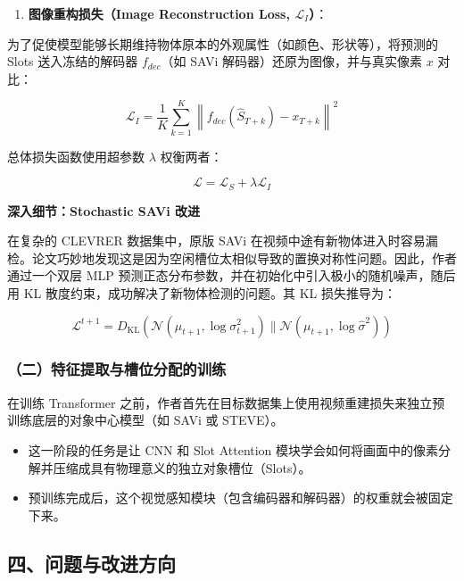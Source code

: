 \begin{enumerate}
\def\labelenumi{\arabic{enumi}.}
\setcounter{enumi}{1}
\tightlist
\item
  \textbf{图像重构损失（Image Reconstruction Loss, \(\mathcal{L}_I\)）}：
\end{enumerate}

为了促使模型能够长期维持物体原本的外观属性（如颜色、形状等），将预测的 Slots 送入冻结的解码器 \(f_{dec}\)（如 SAVi 解码器）还原为图像，并与真实像素 \(x\) 对比：

\[
\mathcal{L}_I = \frac{1}{K}\sum_{k=1}^{K}\left\lVert f_{dec}(\hat{S}_{T+k}) - x_{T+k}\right\rVert^2
\]

总体损失函数使用超参数 \(\lambda\) 权衡两者：

\[
\mathcal{L} = \mathcal{L}_S + \lambda \mathcal{L}_I
\]

\textbf{深入细节：Stochastic SAVi 改进}

在复杂的 CLEVRER 数据集中，原版 SAVi 在视频中途有新物体进入时容易漏检。论文巧妙地发现这是因为空闲槽位太相似导致的置换对称性问题。因此，作者通过一个双层 MLP 预测正态分布参数，并在初始化中引入极小的随机噪声，随后用 KL 散度约束，成功解决了新物体检测的问题。其 KL 损失推导为：

\[
\mathcal{L}^{t+1} = D_{\mathrm{KL}}\left(\mathcal{N}(\mu_{t+1}, \log \sigma_{t+1}^2) \parallel \mathcal{N}(\mu_{t+1}, \log \hat{\sigma}^2)\right)
\]

\hypertarget{ux4e8cux7279ux5f81ux63d0ux53d6ux4e0eux69fdux4f4dux5206ux914dux7684ux8badux7ec3}{%
\subsubsection{（二）特征提取与槽位分配的训练}\label{ux4e8cux7279ux5f81ux63d0ux53d6ux4e0eux69fdux4f4dux5206ux914dux7684ux8badux7ec3}}

在训练 Transformer 之前，作者首先在目标数据集上使用视频重建损失来独立预训练底层的对象中心模型（如 SAVi 或 STEVE）。

\begin{itemize}
\tightlist
\item
  这一阶段的任务是让 CNN 和 Slot Attention 模块学会如何将画面中的像素分解并压缩成具有物理意义的独立对象槽位（Slots）。
\item
  预训练完成后，这个视觉感知模块（包含编码器和解码器）的权重就会被固定下来。
\end{itemize}

\hypertarget{ux56dbux95eeux9898ux4e0eux6539ux8fdbux65b9ux5411}{%
\subsection{四、问题与改进方向}\label{ux56dbux95eeux9898ux4e0eux6539ux8fdbux65b9ux5411}}

